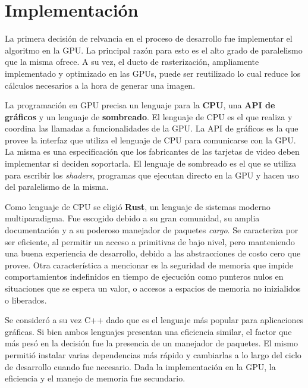 \graphicspath{{chapters/4_implementación/figures}}

\chapter{Implementación}\label{chap:implementation}

La primera decisión de relvancia en el proceso de desarrollo fue implementar el algoritmo en la GPU.
La principal razón para esto es el alto grado de paralelismo que la misma ofrece.
A su vez, el ducto de rasterización, ampliamente implementado y optimizado en las GPUs, puede ser reutilizado lo cual reduce los cálculos necesarios a la hora de generar una imagen.

La programación en GPU precisa un lenguaje para la \textbf{CPU}, una \textbf{API de gráficos} y un lenguaje de \textbf{sombreado}.
El lenguaje de CPU es el que realiza y coordina las llamadas a funcionalidades de la GPU.
La API de gráficos es la que provee la interfaz que utiliza el lenguaje de CPU para comunicarse con la GPU.
La misma es una especificación que los fabricantes de las tarjetas de video deben implementar si deciden soportarla.
El lenguaje de sombreado es el que se utiliza para escribir los \textit{shaders}, programas que ejecutan directo en la GPU y hacen uso del paralelismo de la misma.

Como lenguaje de CPU se eligió \textbf{Rust}, un lenguaje de sistemas moderno multiparadigma.
Fue escogido debido a su gran comunidad, su amplia documentación y a su poderoso manejador de paquetes \textit{cargo}.  
Se caracteriza por ser eficiente, al permitir un acceso a primitivas de bajo nivel, pero manteniendo una buena experiencia de desarrollo, debido a las abstracciones de costo cero que provee.
Otra característica a mencionar es la seguridad de memoria que impide comportamientos indefinidos en tiempo de ejecución como punteros nulos en situaciones que se espera un valor, o accesos a espacios de memoria no inizialidos o liberados.

Se consideró a su vez C++ dado que es el lenguaje más popular para aplicaciones gráficas.  
Si bien ambos lenguajes presentan una eficiencia similar, el factor que más pesó en la decisión fue la presencia de un manejador de paquetes.
El mismo permitió instalar varias dependencias más rápido y cambiarlas a lo largo del ciclo de desarrollo cuando fue necesario.
Dada la implementación en la GPU, la eficiencia y el manejo de memoria fue secundario. 

